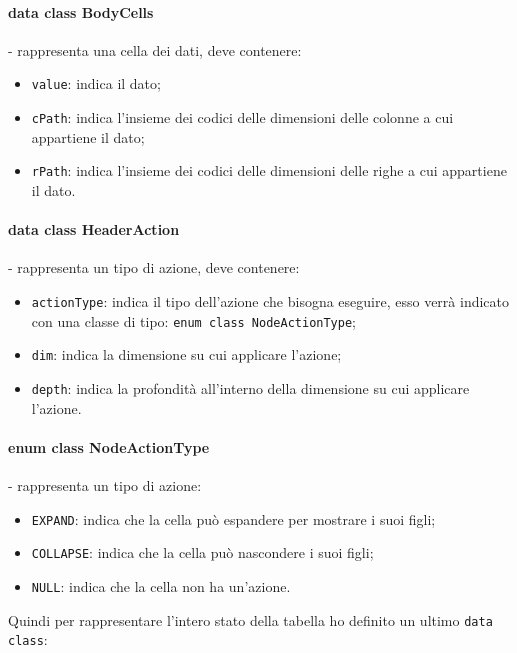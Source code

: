 \paragraph*{data class BodyCells}- rappresenta una cella dei dati, deve contenere:
\begin{itemize}
	\item \verb|value|: indica il dato;
	\item \verb|cPath|: indica l'insieme dei codici delle dimensioni delle colonne a cui appartiene il dato;
	\item \verb|rPath|: indica l'insieme dei codici delle dimensioni delle righe a cui appartiene il dato.
\end{itemize}	

\paragraph*{data class HeaderAction}- rappresenta un tipo di azione, deve contenere:
\begin{itemize}
	\item \verb|actionType|:  indica il tipo dell'azione che bisogna eseguire, esso verrà indicato con una classe di tipo: \verb|enum class NodeActionType|;
	\item \verb|dim|: indica la dimensione su cui applicare l'azione;
	\item \verb|depth|: indica la profondità all'interno della dimensione su cui applicare l'azione.
\end{itemize}

\paragraph*{enum class NodeActionType}- rappresenta un tipo di azione:
\begin{itemize}
	\item \verb|EXPAND|:  indica che la cella può espandere per mostrare i suoi figli;
	\item \verb|COLLAPSE|: indica che la cella può nascondere i suoi figli;
	\item \verb|NULL|: indica che la cella non ha un'azione.
\end{itemize}

Quindi per rappresentare l'intero stato della tabella ho definito un ultimo \verb|data class|:
